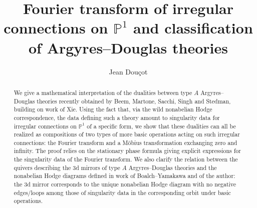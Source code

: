 \documentclass[11pt,a4paper]{amsart}
\numberwithin{equation}{section}
\begin{document}
\renewcommand{\proofname}{Proof}
\renewcommand{\Re}{\operatorname{Re}}
\renewcommand{\Im}{\operatorname{Im}}
\renewcommand{\labelitemi}{$\bullet$}


\newtheorem{theorem}{Theorem}[section]
\newtheorem{proposition}[theorem]{Proposition}
\newtheorem{lemma}[theorem]{Lemma}
\newtheorem{corollary}[theorem]{Corollary}
\newtheorem{conjecture}[theorem]{Conjecture}

\theoremstyle{definition}
\newtheorem{definition}[theorem]{Definition}
\newtheorem{notation}[theorem]{Notation}
\newtheorem{example}[theorem]{Example}
\newtheorem{remark}[theorem]{Remark}
\newtheorem*{claim}{Claim}


\title[Fourier transform of irregular connections and AD theories]{Fourier transform of irregular connections on $\mathbb P^1$ and classification of Argyres--Douglas theories}

\author{Jean Douçot}


\address[J.~Douçot]{`Simion Stoilow' Institute of Mathematics of the Romanian Academy,
	Calea Griviței 21,
	010702-Bucharest, 
	Sector 1, 
	Romania}

\maketitle

\begin{abstract}
We give a mathematical interpretation of the dualities between type $A$ Argyres--Douglas theories recently obtained by Beem, Martone, Sacchi, Singh and Stedman, building on work of Xie. Using the fact that, via the wild nonabelian Hodge correspondence, the data defining such a theory amount to singularity data for irregular connections on $\mathbb P^1$ of a specific form, we show that these dualities can all be realized as compositions of two types of more basic operations acting on such irregular connections: the Fourier transform and a Möbius transformation exchanging zero and infinity. The proof relies on the stationary phase formula giving explicit expressions for the singularity data of the Fourier transform. We also clarify the relation between the quivers describing the 3d mirrors of type $A$ Argyres--Douglas theories and the nonabelian Hodge diagrams defined in work of Boalch--Yamakawa and of the author: the 3d mirror corresponds to the unique nonabelian Hodge diagram with no negative edges/loops among those of singularity data in the corresponding orbit under basic operations.
\end{abstract}
\end{document}

